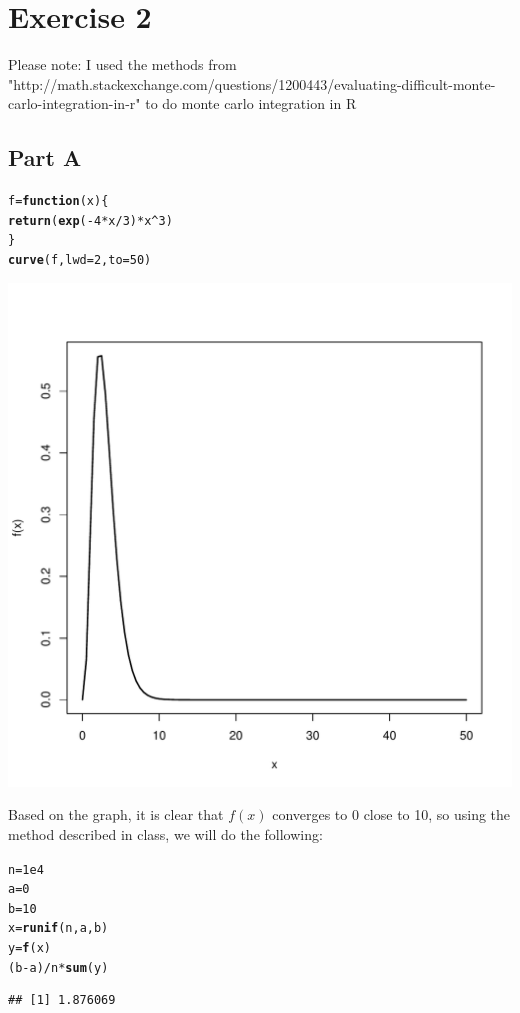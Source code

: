 \documentclass{article}\usepackage[]{graphicx}\usepackage[]{color}
\makeatletter
\newcommand{\hlnum}[1]{\textcolor[rgb]{0.686,0.059,0.569}{#1}}%
\newcommand{\hlopt}[1]{\textcolor[rgb]{0,0,0}{#1}}%
\newcommand{\hlstd}[1]{\textcolor[rgb]{0.345,0.345,0.345}{#1}}%
\newcommand{\hlkwa}[1]{\textcolor[rgb]{0.161,0.373,0.58}{\textbf{#1}}}%
\newcommand{\hlkwb}[1]{\textcolor[rgb]{0.69,0.353,0.396}{#1}}%
\newcommand{\hlkwc}[1]{\textcolor[rgb]{0.333,0.667,0.333}{#1}}%
\newcommand{\hlkwd}[1]{\textcolor[rgb]{0.737,0.353,0.396}{\textbf{#1}}}%
\newenvironment{kframe}{%
 \def\at@end@of@kframe{}%
 \ifinner\ifhmode%
  \def\at@end@of@kframe{\end{minipage}}%
  \begin{minipage}{\columnwidth}%
 \fi\fi%
 \def\FrameCommand##1{\hskip\@totalleftmargin \hskip-\fboxsep
 \colorbox{shadecolor}{##1}\hskip-\fboxsep
     \hskip-\linewidth \hskip-\@totalleftmargin \hskip\columnwidth}%
 \MakeFramed {\advance\hsize-\width
   \@totalleftmargin\z@ \linewidth\hsize
   \@setminipage}}%
 {\par\unskip\endMakeFramed%
 \at@end@of@kframe}
\newenvironment{knitrout}{}{} %
\makeatother
\begin{document}
\section*{Exercise 2}
Please note: I used the methods from "http://math.stackexchange.com/questions/1200443/evaluating-difficult-monte-carlo-integration-in-r" to do monte carlo integration in R
\subsection*{Part A}
\begin{knitrout}
\color{fgcolor}\begin{kframe}
\begin{alltt}
\hlstd{f} \hlkwb{=} \hlkwa{function}\hlstd{(}\hlkwc{x}\hlstd{)\{}
  \hlkwd{return}\hlstd{(}\hlkwd{exp}\hlstd{(}\hlopt{-}\hlnum{4}\hlopt{*}\hlstd{x}\hlopt{/}\hlnum{3}\hlstd{)}\hlopt{*}\hlstd{x}\hlopt{^}\hlnum{3}\hlstd{)}
\hlstd{\}}
\hlkwd{curve}\hlstd{(f,} \hlkwc{lwd}\hlstd{=}\hlnum{2}\hlstd{,}\hlkwc{to} \hlstd{=} \hlnum{50}\hlstd{)}
\end{alltt}
\end{kframe}
\includegraphics[width=0.60\linewidth]{figure/unnamed-chunk-3-1} 

\end{knitrout}
Based on the graph, it is clear that $f(x)$ converges to 0 close to 10, so using the method described in class, we will do the following:
\begin{knitrout}
\color{fgcolor}\begin{kframe}
\begin{alltt}
\hlstd{n} \hlkwb{=} \hlnum{1e4}
\hlstd{a} \hlkwb{=} \hlnum{0}
\hlstd{b} \hlkwb{=} \hlnum{10}
\hlstd{x} \hlkwb{=} \hlkwd{runif}\hlstd{(n, a, b)}
\hlstd{y} \hlkwb{=} \hlkwd{f}\hlstd{(x)}
\hlstd{(b}\hlopt{-}\hlstd{a)}\hlopt{/}\hlstd{n}\hlopt{*}\hlkwd{sum}\hlstd{(y)}
\end{alltt}
\begin{verbatim}
## [1] 1.876069
\end{verbatim}
\end{kframe}
\end{knitrout}
\end{document}
